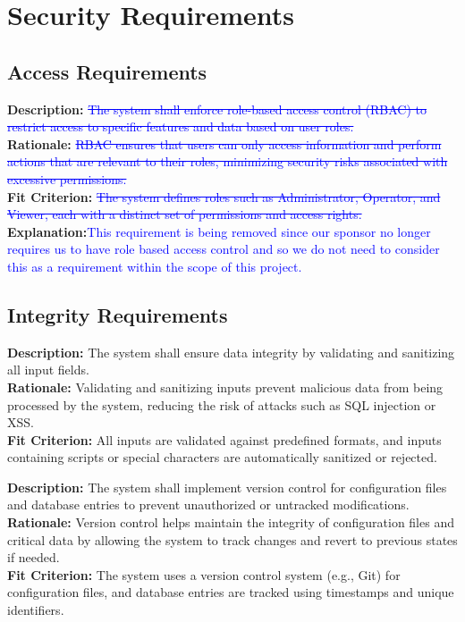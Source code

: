 \documentclass[12pt]{article}
\begin{document}
\section{Security Requirements}

\subsection{Access Requirements}


\begin{tcolorbox}[title=SEC-ACC1]
\textbf{Description:} \textcolor{blue}{\sout{The system shall enforce role-based access control (RBAC) to restrict access to specific features and data based on user roles.}} \\
\textbf{Rationale:} \textcolor{blue}{\sout{RBAC ensures that users can only access information and perform actions that are relevant to their roles, minimizing security risks associated with excessive permissions.}} \\
\textbf{Fit Criterion:} \textcolor{blue}{\sout{The system defines roles such as Administrator, Operator, and Viewer, each with a distinct set of permissions and access rights.}}\\
\textbf{Explanation:}\textcolor{blue}{This requirement is being removed since our sponsor no longer requires us to have role based access control and so we do not need to consider this as a requirement within the scope of this project.}
\end{tcolorbox}

\subsection{Integrity Requirements}
\begin{tcolorbox}[title=SEC-INT1]
\textbf{Description:} The system shall ensure data integrity by validating and sanitizing all input fields. \\
\textbf{Rationale:} Validating and sanitizing inputs prevent malicious data from being processed by the system, reducing the risk of attacks such as SQL injection or XSS. \\
\textbf{Fit Criterion:} All inputs are validated against predefined formats, and inputs containing scripts or special characters are automatically sanitized or rejected.
\end{tcolorbox}

\begin{tcolorbox}[title=SEC-INT2]
\textbf{Description:} The system shall implement version control for configuration files and database entries to prevent unauthorized or untracked modifications. \\
\textbf{Rationale:} Version control helps maintain the integrity of configuration files and critical data by allowing the system to track changes and revert to previous states if needed. \\
\textbf{Fit Criterion:} The system uses a version control system (e.g., Git) for configuration files, and database entries are tracked using timestamps and unique identifiers.
\end{tcolorbox}
\end{document}
